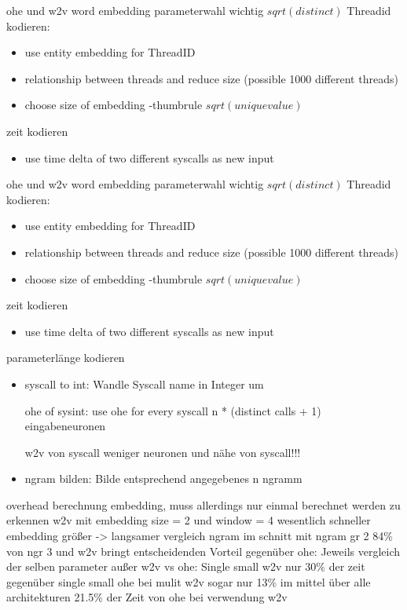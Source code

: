                 ohe und w2v
                word embedding parameterwahl wichtig $sqrt(distinct)$
                Threadid kodieren: 
                \begin{itemize}
                    \item use entity embedding for ThreadID~\cite{GUO2016} 
                    \item relationship between threads and reduce size (possible 1000 different threads)
                    \item choose size of embedding -thumbrule $sqrt(unique value)$
                \end{itemize}
                zeit kodieren
                \begin{itemize}
                    \item use time delta of two different syscalls as new input
                \end{itemize}
                ohe und w2v
                word embedding parameterwahl wichtig $sqrt(distinct)$
                Threadid kodieren: 
                \begin{itemize}
                    \item use entity embedding for ThreadID~\cite{GUO2016} 
                    \item relationship between threads and reduce size (possible 1000 different threads)
                    \item choose size of embedding -thumbrule $sqrt(unique value)$
                \end{itemize}
                zeit kodieren
                \begin{itemize}
                    \item use time delta of two different syscalls as new input
                \end{itemize}
                parameterlänge kodieren
                \begin{itemize}
                    \item syscall to int: Wandle Syscall name in Integer um

                     ohe of sysint: use ohe for every syscall 
                     n * (distinct calls + 1) eingabeneuronen 

                     w2v von syscall
                     weniger neuronen und nähe von syscall!!!
                    \item ngram bilden: Bilde entsprechend angegebenes n ngramm
                \end{itemize}
                overhead berechnung embedding, muss allerdings nur einmal berechnet werden
                zu erkennen w2v mit embedding size = 2  und window = 4 wesentlich schneller
                embedding größer -> langsamer
                vergleich ngram
                im schnitt mit ngram gr 2 84\% von ngr 3 und 
                w2v bringt entscheidenden Vorteil gegenüber ohe:
                Jeweils vergleich der selben parameter außer w2v vs ohe:
                Single small w2v nur 30\% der zeit gegenüber single small ohe
                bei mulit w2v sogar nur 13\%
                im mittel über alle architekturen 21.5\% der Zeit von ohe bei verwendung w2v

